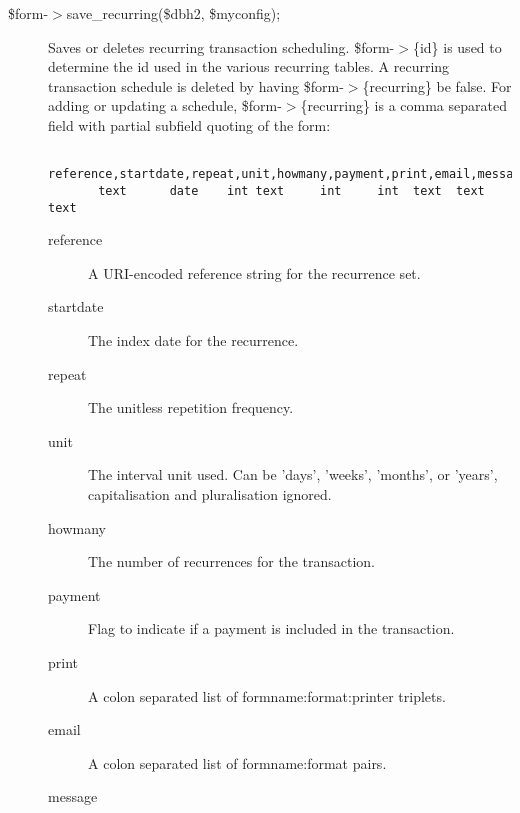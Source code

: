 \begin{description}
\begin{description}
\begin{description}
\begin{description}
\begin{description}
\begin{description}
\item[{\$form-$>$save\_recurring(\$dbh2, \$myconfig);}] \mbox{}

Saves or deletes recurring transaction scheduling.  \$form-$>$\{id\} is used to
determine the id used in the various recurring tables.  A recurring transaction
schedule is deleted by having \$form-$>$\{recurring\} be false.  For adding or
updating a schedule, \$form-$>$\{recurring\} is a comma separated field with partial
subfield quoting of the form:

\begin{verbatim}
  reference,startdate,repeat,unit,howmany,payment,print,email,message
       text      date    int text     int     int  text  text    text
\end{verbatim}
\begin{description}

\item[{reference}] \mbox{}

A URI-encoded reference string for the recurrence set.


\item[{startdate}] \mbox{}

The index date for the recurrence.


\item[{repeat}] \mbox{}

The unitless repetition frequency.


\item[{unit}] \mbox{}

The interval unit used.  Can be 'days', 'weeks', 'months', or 'years',
capitalisation and pluralisation ignored.


\item[{howmany}] \mbox{}

The number of recurrences for the transaction.


\item[{payment}] \mbox{}

Flag to indicate if a payment is included in the transaction.


\item[{print}] \mbox{}

A colon separated list of formname:format:printer triplets.


\item[{email}] \mbox{}

A colon separated list of formname:format pairs.


\item[{message}] \mbox{}


\end{description}
\end{description}
\end{description}
\end{description}
\end{description}
\end{description}
\end{description}
